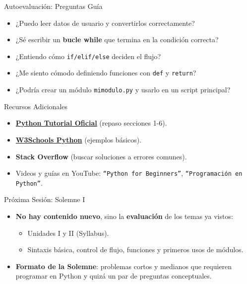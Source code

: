 \documentclass[10pt]{beamer}
\begin{document}
\begin{frame}{Autoevaluación: Preguntas Guía}
  \begin{itemize}
    \item ¿Puedo leer datos de usuario y convertirlos correctamente?
    \item ¿Sé escribir un \textbf{bucle while} que termina en la condición correcta?
    \item ¿Entiendo cómo \texttt{if/elif/else} deciden el flujo?
    \item ¿Me siento cómodo definiendo funciones con \texttt{def} y \texttt{return}?
    \item ¿Podría crear un módulo \texttt{mimodulo.py} y usarlo en un script principal?
  \end{itemize}
\end{frame}

\begin{frame}{Recursos Adicionales}
  \begin{itemize}
    \item \href{https://docs.python.org/3/tutorial/}{\textbf{Python Tutorial Oficial}} (repaso secciones 1-6).
    \item \href{https://www.w3schools.com/python/}{\textbf{W3Schools Python}} (ejemplos básicos).
    \item \textbf{Stack Overflow} (buscar soluciones a errores comunes).
    \item Videos y guías en YouTube: \texttt{“Python for Beginners”}, \texttt{“Programación en Python”}.
  \end{itemize}
\end{frame}

\begin{frame}{Próxima Sesión: Solemne I}
  \begin{itemize}
    \item \textbf{No hay contenido nuevo}, sino la \textbf{evaluación} de los temas ya vistos:
      \begin{itemize}
        \item Unidades I y II (Syllabus).
        \item Sintaxis básica, control de flujo, funciones y primeros usos de módulos.
      \end{itemize}
    \item \textbf{Formato de la Solemne}: problemas cortos y medianos que requieren programar en Python y quizá un par de preguntas conceptuales.
  \end{itemize}
\end{frame}
\end{document}
